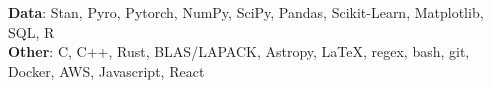 \documentclass[11pt]{extarticle}
\begin{document}
\textbf{Data}: Stan, Pyro, Pytorch, NumPy, SciPy, Pandas, Scikit-Learn, Matplotlib, SQL, R \\
\textbf{Other}: C, C++, Rust, BLAS/LAPACK, Astropy, \LaTeX, regex, bash, git, Docker, AWS, Javascript, React





\end{document}
